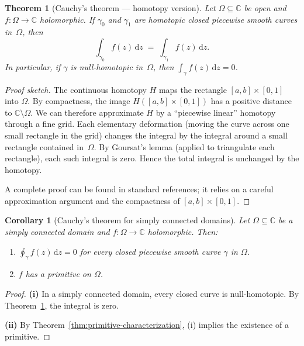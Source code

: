 \documentclass[12pt,a4paper,openany]{book}
\theoremstyle{definition}
\theoremstyle{plain}
\newtheorem{theorem}[definition]{Theorem}
\newtheorem{corollary}[definition]{Corollary}
\theoremstyle{remark}
\newcommand{\C}{\mathbb{C}}
\newcommand{\dd}{\mathrm{d}}
\begin{document}
\begin{theorem}[Cauchy's theorem --- homotopy version]\label{thm:cauchy-homotopy}
Let $\Omega\subseteq\C$ be open and $f\colon\Omega\to\C$ holomorphic.
If $\gamma_0$ and $\gamma_1$ are homotopic closed piecewise smooth curves
in~$\Omega$, then
\[
  \int_{\gamma_0}f(z)\,\dd z \;=\; \int_{\gamma_1}f(z)\,\dd z.
\]
In particular, if $\gamma$ is null-homotopic in~$\Omega$, then
$\int_\gamma f(z)\,\dd z = 0$.
\end{theorem}

\begin{proof}[Proof sketch]
The continuous homotopy $H$ maps the rectangle $[a,b]\times[0,1]$ into $\Omega$.
By compactness, the image $H([a,b]\times[0,1])$ has a positive distance to
$\C\setminus\Omega$. We can therefore approximate $H$ by a ``piecewise linear''
homotopy through a fine grid.  Each elementary deformation (moving the curve
across one small rectangle in the grid) changes the integral by the integral
around a small rectangle contained in~$\Omega$.  By Goursat's lemma
(applied to triangulate each rectangle), each such integral is zero.
Hence the total integral is unchanged by the homotopy.

A complete proof can be found in standard references; it relies on a careful
approximation argument and the compactness of $[a,b]\times[0,1]$.
\end{proof}

\begin{corollary}[Cauchy's theorem for simply connected domains]%
\label{cor:cauchy-simply-connected}
Let $\Omega\subseteq\C$ be a simply connected domain and $f\colon\Omega\to\C$
holomorphic.  Then:
\begin{enumerate}[label=\textup{(\roman*)}]
  \item $\displaystyle\oint_\gamma f(z)\,\dd z = 0$ for every closed piecewise smooth
    curve $\gamma$ in $\Omega$.
  \item $f$ has a primitive on $\Omega$.
\end{enumerate}
\end{corollary}

\begin{proof}
\textbf{(i)} In a simply connected domain, every closed curve is null-homotopic.
By Theorem~\ref{thm:cauchy-homotopy}, the integral is zero.

\textbf{(ii)} By Theorem~\ref{thm:primitive-characterization},
(i) implies the existence of a primitive.
\end{proof}
\end{document}
